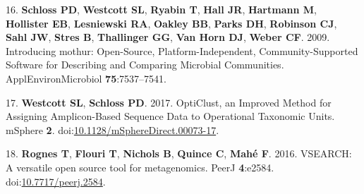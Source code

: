 \documentclass[11pt,]{article}
\begin{document}
\hypertarget{ref-schloss_introducing_2009}{}
16. \textbf{Schloss PD}, \textbf{Westcott SL}, \textbf{Ryabin T},
\textbf{Hall JR}, \textbf{Hartmann M}, \textbf{Hollister EB},
\textbf{Lesniewski RA}, \textbf{Oakley BB}, \textbf{Parks DH},
\textbf{Robinson CJ}, \textbf{Sahl JW}, \textbf{Stres B},
\textbf{Thallinger GG}, \textbf{Van Horn DJ}, \textbf{Weber CF}. 2009.
Introducing mothur: Open-Source, Platform-Independent,
Community-Supported Software for Describing and Comparing Microbial
Communities. ApplEnvironMicrobiol \textbf{75}:7537--7541.

\hypertarget{ref-westcott_opticlust_2017}{}
17. \textbf{Westcott SL}, \textbf{Schloss PD}. 2017. OptiClust, an
Improved Method for Assigning Amplicon-Based Sequence Data to
Operational Taxonomic Units. mSphere \textbf{2}.
doi:\href{https://doi.org/10.1128/mSphereDirect.00073-17}{10.1128/mSphereDirect.00073-17}.

\hypertarget{ref-rognes_vsearch_2016}{}
18. \textbf{Rognes T}, \textbf{Flouri T}, \textbf{Nichols B},
\textbf{Quince C}, \textbf{Mahé F}. 2016. VSEARCH: A versatile open
source tool for metagenomics. PeerJ \textbf{4}:e2584.
doi:\href{https://doi.org/10.7717/peerj.2584}{10.7717/peerj.2584}.
\end{document}
